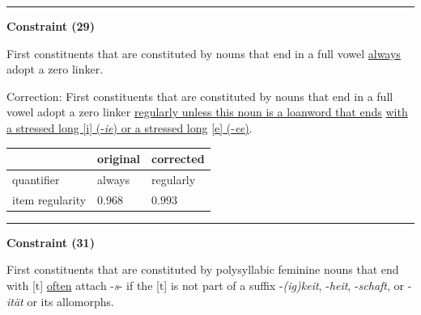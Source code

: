 \vspace{-0.75em}
\hrule




\vspace{0.6em}

\begin{center}
\textbf{Constraint (29)}
\end{center}

\noindent
First constituents that are constituted by nouns that end in a full vowel \underline{always} adopt a zero linker.
\vspace{0.3em}

\noindent
Correction: First constituents that are constituted by nouns that end in a full vowel adopt a zero linker \underline{regularly unless this noun is a loanword that ends} \underline{with a stressed long [i] (-\textit{ie}) or a stressed long} \underline{[e] (-\textit{ee})}.

\vspace{-0.25em}

\begin{table}[!ht]

\begin{center}

\begin{tabularx}{\columnwidth}{|X|X|X|}
      \hline
                        & original      & corrected \\
      \hline
      quantifier        & always      & regularly   \\
      \hline
      item regularity   & $0.968$      & $0.993$   \\
      \hline
\end{tabularx}
\end{center}
\end{table}

\vspace{-0.75em}
\hrule




\vspace{0.6em}

\begin{center}
\textbf{Constraint (31)}
\end{center}

\noindent
First constituents that are constituted by polysyllabic feminine nouns that end with [t] \underline{often} attach -\textit{s}- if the [t] is not part of a suffix -\textit{(ig)keit}, -\textit{heit}, -\textit{schaft}, or -\textit{ität} or its allomorphs.
\vspace{0.3em}

